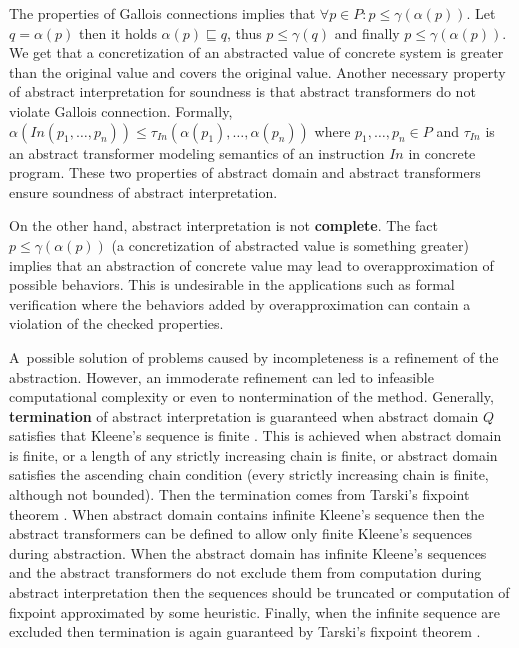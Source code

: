 \documentclass[a4paper, 12pt]{article}
\newcommand{\aord}[0]{\sqsubseteq}
\newcommand{\cord}[0]{\leq}
\newcommand{\adom}[0]{Q}
\newcommand{\aitem}[0]{q}
\newcommand{\cdom}[0]{P}
\newcommand{\citem}[0]{p}
\newcommand{\atrans}[0]{\tau}
\newcommand{\afun}[0]{\alpha}
\newcommand{\cfun}[0]{\gamma}
\begin{document}
The properties of Gallois connections implies that
$\forall \citem \in \cdom: \citem \cord \cfun(\afun(\citem))$.
Let $q = \afun(\citem)$ then it holds $\alpha(\citem) \aord \aitem$,
thus $\citem \cord \cfun(\aitem)$ and finally $\citem \cord \cfun(\afun(\citem))$.
We get that a concretization of an abstracted value of concrete system
is greater than the original value and covers the original value.
Another necessary property of abstract interpretation for soundness is
that abstract transformers do not violate Gallois connection.
Formally, $\alpha(In(\citem_1,\ldots,\citem_n)) \cord \atrans_{In}(\alpha(\citem_1),\ldots, \alpha(\citem_n))$
where $\citem_1,\ldots,\citem_n \in \cdom$ and $\atrans_{In}$ is an abstract transformer
modeling semantics of an instruction $In$ in concrete program.
These two properties of abstract domain and abstract transformers ensure
soundness of abstract interpretation.

On the other hand, abstract interpretation is not \textbf{complete}.
The fact $\citem \cord \cfun(\afun(\citem))$ (a concretization of abstracted value
is something greater) implies that an abstraction of concrete value may lead
to overapproximation of possible behaviors.
This is undesirable in the applications such as formal verification
where the behaviors added by overapproximation can contain
a violation of the checked properties.

A~possible solution of problems caused by incompleteness is a refinement of the abstraction.
However, an immoderate refinement can led to infeasible computational complexity
or even to nontermination of the method.
Generally, \textbf{termination} of abstract interpretation is guaranteed
when abstract domain $\adom$ satisfies that Kleene's sequence is finite \cite{popl77}.
This is achieved when abstract domain is finite, or a length of any strictly
increasing chain is finite, or abstract domain satisfies the ascending chain
condition (every strictly increasing chain is finite, although not bounded).
Then the termination comes from Tarski's fixpoint theorem \cite{tarski}.
When abstract domain contains infinite Kleene's sequence
then the abstract transformers can be defined to allow only finite
Kleene's sequences during abstraction.
When the abstract domain has infinite Kleene's sequences and
the abstract transformers do not exclude them from computation during abstract
interpretation then the sequences should be truncated or computation
of fixpoint approximated by some heuristic.
Finally, when the infinite sequence are excluded then termination is
again guaranteed by Tarski's fixpoint theorem \cite{popl77}.
\end{document}
